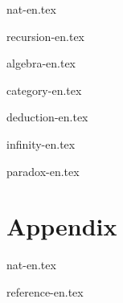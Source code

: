 \documentclass[UTF8, a4paper,twoside]{book} %
\begin{document}


\tableofcontents
\newpage

{nat-en.tex}

{recursion-en.tex}

{algebra-en.tex}

{category-en.tex}

{deduction-en.tex}

{infinity-en.tex}

{paradox-en.tex}

\part{Appendix}
\appendix
\noappendicestocpagenum
\addappheadtotoc

{nat-en.tex}


{reference-en.tex}

\printindex


\end{document}
